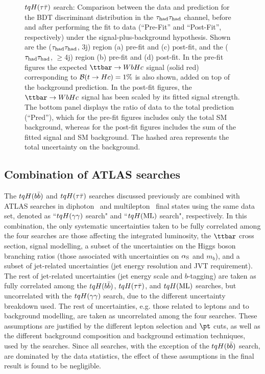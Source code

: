 \begin{figure}[htbp]
\begin{center}
\caption{\small{$tqH(\tau\bar{\tau})$ search: Comparison between the data and prediction for the BDT discriminant distribution in the 
$\tau_{\mathrm{had}} \tau_{\mathrm{had}}$ channel, before and after performing the fit to data  (``Pre-Fit'' and ``Post-Fit'', respectively) under the signal-plus-background hypothesis.
Shown are the ($\tau_{\mathrm{had}} \tau_{\mathrm{had}}$, 3j) region (a) pre-fit and (c) post-fit, and the ($\tau_{\mathrm{had}} \tau_{\mathrm{had}}$, $\geq$4j) region (b) pre-fit and (d) post-fit.
In the pre-fit figures the expected $\Hc$ signal (solid red) corresponding to $\mathcal{B}(t\to Hc)=1\%$ is also shown,
added on top of the background prediction. In the post-fit figures, the $\Hc$ signal has been scaled by its fitted signal strength.
The bottom panel displays the ratio of data to the total prediction (``Pred''), which for the pre-fit figures includes only the total SM background,
whereas for the post-fit figures includes the sum of the fitted signal and SM background.
The hashed area represents the total uncertainty on the background. }}
\label{fig:prepostfit_unblinded_WbHc_hh}
\end{center}
\end{figure}

\subsection{Combination of ATLAS searches}
\label{sec:results_combo}

The $tqH(b\bar{b})$ and $tqH(\tau\bar{\tau})$ searches discussed previously are combined with ATLAS searches in 
diphoton~\cite{Aaboud:2017mfd} and multilepton~\cite{Aaboud:2018pob} final states using the same data set, 
denoted as ``$tqH(\gamma\gamma)$ search" and ``$tqH(\mathrm{ML})$ search", respectively.
In this combination, the only systematic uncertainties taken to be fully correlated among the four searches are 
those affecting the integrated luminosity, the $\ttbar$ cross section, signal modelling, a subset of the uncertainties
on the Higgs boson branching ratios (those associated with uncertainties on $\alpha_{\rm S}$ and $m_b$), 
and a subset of jet-related uncertainties (jet energy resolution and JVT requirement). 
The rest of jet-related uncertainties (jet energy scale and $b$-tagging) are taken as fully correlated among 
the $tqH(b\bar{b})$, $tqH(\tau\bar{\tau})$, and $tqH(\mathrm{ML})$ searches, but uncorrelated with the $tqH(\gamma\gamma)$ search, due to the different
uncertainty breakdown used. The rest of uncertainties, e.g. those related to leptons and to background modelling, are taken
as uncorrelated among the four searches. These assumptions are justified by the different lepton selection and $\pt$ cuts, 
as well as the different background composition and background estimation techniques, used by the searches.
Since all searches,  with the exception of the $tqH(b\bar{b})$ search, are dominated 
by the data statistics, the effect of these assumptions in the final result is found to be negligible.

